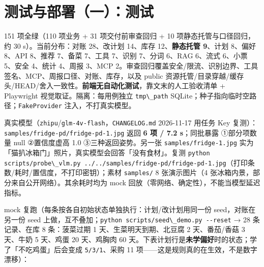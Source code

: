 \section{测试与部署（一）：测试}\label{ux6d4bux8bd5ux4e0eux9a8cux8bc1}

151 项全绿（110 项业务 + 31 项交付前审查回归 + 10
项静态托管与口径回归，约 30 s）。当前分布：对账 28、改计划 14、库存
12、\textbf{静态托管 9}、计划 8、偏好 8、API 8、推荐 7、备菜 7、工具
7、识别 7、分词 6、RAG 6、流式 6、小票 5、安全 4、统计 4、周报 3、MCP
2。审查回归覆盖安全/限流、识别边界、工具签名、MCP、周报口径、对账、库存，以及
public
资源托管/目录穿越/缓存头/HEAD/舍入一致性。\textbf{前端无自动化测试}，靠文末的人工验收清单
+ Playwright 视觉取证。隔离：每用例独立
\passthrough{\lstinline!tmp\_path!}
SQLite；种子指向临时空路径；\passthrough{\lstinline!FakeProvider!}
注入，不打真实模型。

真实模型（\passthrough{\lstinline!zhipu!}/\passthrough{\lstinline!glm-4v-flash!}，\passthrough{\lstinline!CHANGELOG.md!}
2026-11-17 用任务 Key 复测）：\passthrough{\lstinline!samples/fridge-pd/fridge-pd-1.jpg!}
返回 \textbf{6 项 / 7.2 s}；同批暴露 ①部分项数量
null ②置信度虚高 1.0 ③三种返回姿势。另一张
\passthrough{\lstinline!samples/fridge-1.jpg!} 实为「猫扒冰箱门」照片，真实模型会回答「没有食材」。复测
\passthrough{\lstinline!python scripts/probe\_vlm.py ../../samples/fridge-pd/fridge-pd-1.jpg!}（打印条数/耗时/置信度，不打印密钥）；素材
\passthrough{\lstinline!samples/!} 8 张演示图片（4 张冰箱内景，部分来自公开网络）。其余耗时均为 mock
回放（零网络、确定性），不能当模型延迟指标。

mock 复跑（每条按各自初始状态单独执行：计划/改计划用同一份
seed，对账在另一份 seed
上做，互不叠加；\passthrough{\lstinline!python scripts/seed\_demo.py --reset!}
→ 28 条记录、在库 8 条：菠菜过期 1 天、生菜明天到期、北豆腐 2
天、番茄/香菇 3 天、牛奶 5 天、鸡蛋 20 天、鸡胸肉 60
天。下表计划行是\textbf{未学偏好}时的状态；学了「不吃鸡蛋」后会变成
\passthrough{\lstinline!5/3/1!}、采购 11
项------这是规则真的在生效，不是数字漂移）：

